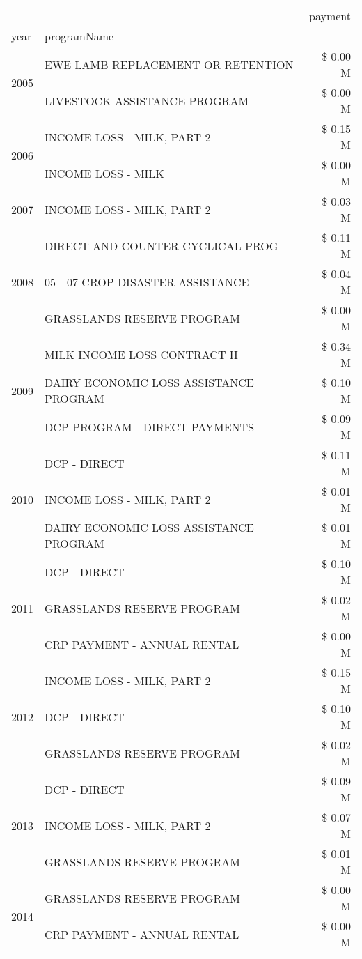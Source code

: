 \begin{tabular}{llr}
\toprule
 &  & payment \\
year & programName &  \\
\midrule
\multirow[t]{2}{*}{2005} & EWE LAMB REPLACEMENT OR RETENTION & \$ 0.00 M \\
 & LIVESTOCK ASSISTANCE PROGRAM & \$ 0.00 M \\
\cline{1-3}
\multirow[t]{2}{*}{2006} & INCOME LOSS - MILK, PART 2 & \$ 0.15 M \\
 & INCOME LOSS - MILK & \$ 0.00 M \\
\cline{1-3}
2007 & INCOME LOSS - MILK, PART 2 & \$ 0.03 M \\
\cline{1-3}
\multirow[t]{3}{*}{2008} & DIRECT AND COUNTER CYCLICAL PROG & \$ 0.11 M \\
 & 05 - 07 CROP DISASTER ASSISTANCE & \$ 0.04 M \\
 & GRASSLANDS RESERVE PROGRAM & \$ 0.00 M \\
\cline{1-3}
\multirow[t]{3}{*}{2009} & MILK INCOME LOSS CONTRACT II & \$ 0.34 M \\
 & DAIRY ECONOMIC LOSS ASSISTANCE PROGRAM & \$ 0.10 M \\
 & DCP PROGRAM - DIRECT PAYMENTS & \$ 0.09 M \\
\cline{1-3}
\multirow[t]{3}{*}{2010} & DCP - DIRECT & \$ 0.11 M \\
 & INCOME LOSS - MILK, PART 2 & \$ 0.01 M \\
 & DAIRY ECONOMIC LOSS ASSISTANCE PROGRAM & \$ 0.01 M \\
\cline{1-3}
\multirow[t]{3}{*}{2011} & DCP - DIRECT & \$ 0.10 M \\
 & GRASSLANDS RESERVE PROGRAM & \$ 0.02 M \\
 & CRP PAYMENT - ANNUAL RENTAL & \$ 0.00 M \\
\cline{1-3}
\multirow[t]{3}{*}{2012} & INCOME LOSS - MILK, PART 2 & \$ 0.15 M \\
 & DCP - DIRECT & \$ 0.10 M \\
 & GRASSLANDS RESERVE PROGRAM & \$ 0.02 M \\
\cline{1-3}
\multirow[t]{3}{*}{2013} & DCP - DIRECT & \$ 0.09 M \\
 & INCOME LOSS - MILK, PART 2 & \$ 0.07 M \\
 & GRASSLANDS RESERVE PROGRAM & \$ 0.01 M \\
\cline{1-3}
\multirow[t]{3}{*}{2014} & GRASSLANDS RESERVE PROGRAM & \$ 0.00 M \\
 & CRP PAYMENT - ANNUAL RENTAL & \$ 0.00 M \\

\end{tabular}
